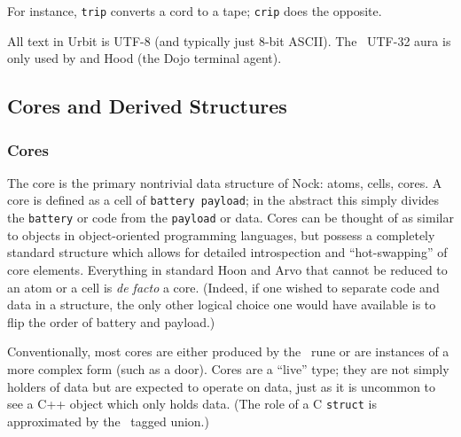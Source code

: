 For instance, \texttt{trip} converts a cord to a tape; \texttt{crip} does the opposite.




All text in Urbit is UTF-8 (and typically just 8-bit ASCII).  The \patc~UTF-32 aura is only used by \dill and Hood (the Dojo terminal agent).


\subsection{Cores and Derived Structures}

\subsubsection{Cores}

The core is the primary nontrivial data structure of Nock:  atoms, cells, cores.  A core is defined as a cell of \texttt{battery payload}; in the abstract this simply divides the \texttt{battery} or code from the \texttt{payload} or data.  Cores can be thought of as similar to objects in object-oriented programming languages, but possess a completely standard structure which allows for detailed introspection and “hot-swapping” of core elements.  Everything in standard Hoon and Arvo that cannot be reduced to an atom or a cell is \emph{de facto} a core.  (Indeed, if one wished to separate code and data in a structure, the only other logical choice one would have available is to flip the order of battery and payload.)

Conventionally, most cores are either produced by the \pbarcen~rune or are instances of a more complex form (such as a door).  Cores are a “live” type; they are not simply holders of data but are expected to operate on data, just as it is uncommon to see a C++ object which only holds data.  (The role of a C \texttt{struct} is approximated by the \buccen~tagged union.)

